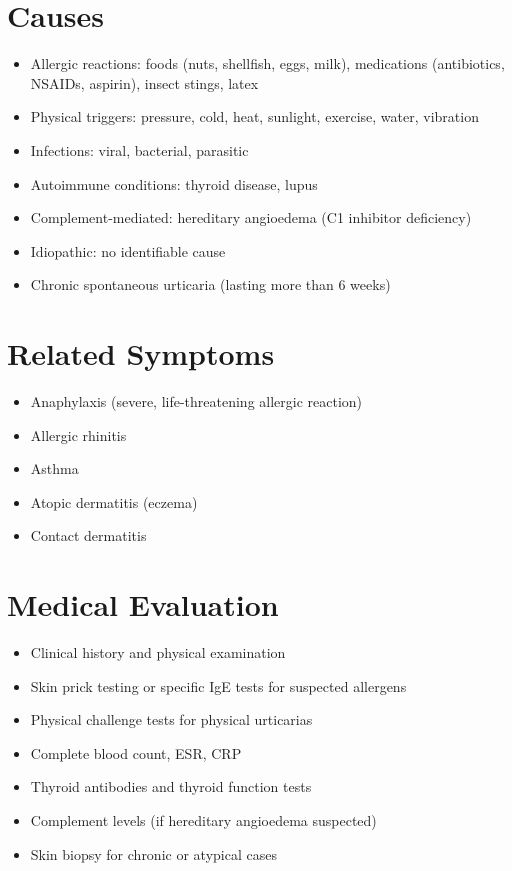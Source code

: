 \section*{Causes}
\begin{itemize}
\item Allergic reactions: foods (nuts, shellfish, eggs, milk), medications (antibiotics, NSAIDs, aspirin), insect stings, latex
\item Physical triggers: pressure, cold, heat, sunlight, exercise, water, vibration
\item Infections: viral, bacterial, parasitic
\item Autoimmune conditions: thyroid disease, lupus
\item Complement-mediated: hereditary angioedema (C1 inhibitor deficiency)
\item Idiopathic: no identifiable cause
\item Chronic spontaneous urticaria (lasting more than 6 weeks)
\end{itemize}

\section*{Related Symptoms}
\begin{itemize}
\item Anaphylaxis (severe, life-threatening allergic reaction)
\item Allergic rhinitis
\item Asthma
\item Atopic dermatitis (eczema)
\item Contact dermatitis
\end{itemize}

\section*{Medical Evaluation}
\begin{itemize}
\item Clinical history and physical examination
\item Skin prick testing or specific IgE tests for suspected allergens
\item Physical challenge tests for physical urticarias
\item Complete blood count, ESR, CRP
\item Thyroid antibodies and thyroid function tests
\item Complement levels (if hereditary angioedema suspected)
\item Skin biopsy for chronic or atypical cases
\end{itemize}

